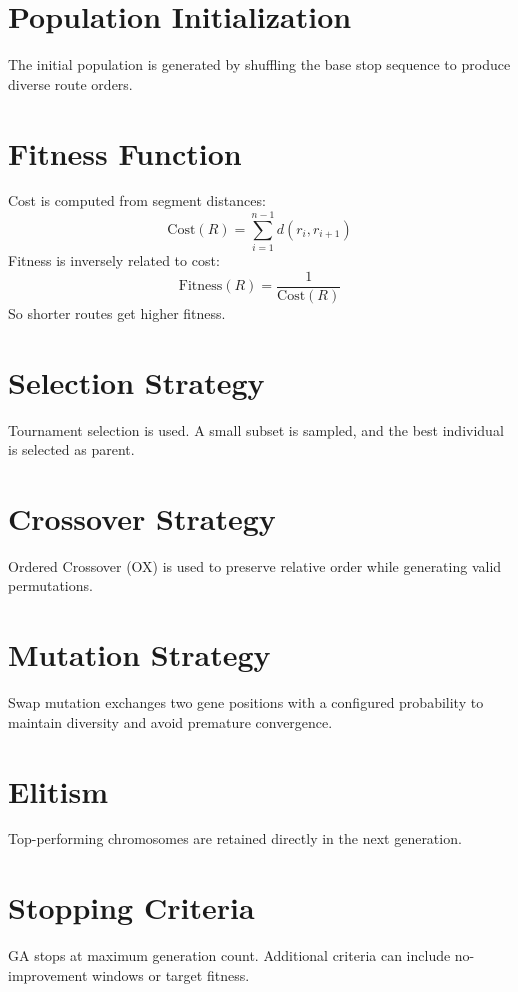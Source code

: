 \documentclass[12pt,a4paper]{report}
\begin{document}
\section{Population Initialization}
The initial population is generated by shuffling the base stop sequence to produce diverse route orders.

\section{Fitness Function}
Cost is computed from segment distances:
\begin{equation}
\text{Cost}(R) = \sum_{i=1}^{n-1} d(r_i, r_{i+1})
\end{equation}
Fitness is inversely related to cost:
\begin{equation}
\text{Fitness}(R) = \frac{1}{\text{Cost}(R)}
\end{equation}
So shorter routes get higher fitness.

\section{Selection Strategy}
Tournament selection is used. A small subset is sampled, and the best individual is selected as parent.

\section{Crossover Strategy}
Ordered Crossover (OX) is used to preserve relative order while generating valid permutations.

\section{Mutation Strategy}
Swap mutation exchanges two gene positions with a configured probability to maintain diversity and avoid premature convergence.

\section{Elitism}
Top-performing chromosomes are retained directly in the next generation.

\section{Stopping Criteria}
GA stops at maximum generation count. Additional criteria can include no-improvement windows or target fitness.
\end{document}
